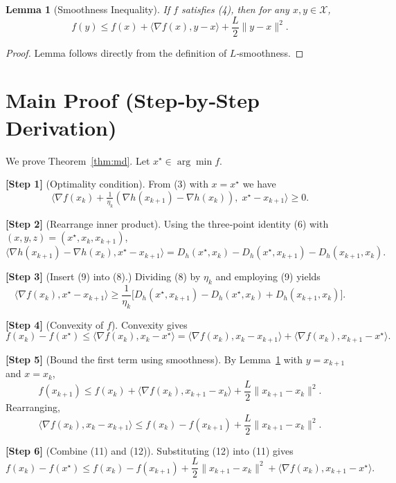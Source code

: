 \documentclass{article}
\newtheorem{lemma}{Lemma}
\begin{document}
\begin{lemma}[Smoothness Inequality]\label{lem:smooth}
If $f$ satisfies (4), then for any $x,y\in\mathcal X$,
\[
f(y)\le f(x)+\langle\nabla f(x),y-x\rangle+\frac{L}{2}\|y-x\|^{2}. \tag{7}
\]
\end{lemma}
\begin{proof}
Lemma follows directly from the definition of $L$‑smoothness. \hfill\qedsymbol
\end{proof}

\section*{Main Proof (Step‑by‑Step Derivation)}
We prove Theorem~\ref{thm:md}. Let $x^{\star}\in\arg\min f$.

\medskip
\noindent\textbf{[Step 1]} (Optimality condition).  
From (3) with $x=x^{\star}$ we have
\[
\big\langle\nabla f(x_{k})+\tfrac{1}{\eta_{k}}(\nabla h(x_{k+1})-\nabla h(x_{k})),
\;x^{\star}-x_{k+1}\big\rangle\ge0.
\tag{8}
\]

\noindent\textbf{[Step 2]} (Rearrange inner product).  
Using the three‑point identity (6) with $(x,y,z)=(x^{\star},x_{k},x_{k+1})$,
\[
\langle\nabla h(x_{k+1})-\nabla h(x_{k}),x^{\star}-x_{k+1}\rangle
= D_{h}(x^{\star},x_{k})-D_{h}(x^{\star},x_{k+1})-D_{h}(x_{k+1},x_{k}). \tag{9}
\]

\noindent\textbf{[Step 3]} (Insert (9) into (8).)  
Dividing (8) by $\eta_{k}$ and employing (9) yields
\[
\langle\nabla f(x_{k}),x^{\star}-x_{k+1}\rangle
\ge\frac{1}{\eta_{k}}\big[D_{h}(x^{\star},x_{k+1})-D_{h}(x^{\star},x_{k})+D_{h}(x_{k+1},x_{k})\big]. \tag{10}
\]

\noindent\textbf{[Step 4]} (Convexity of $f$).  
Convexity gives
\[
f(x_{k})-f(x^{\star})\le\langle\nabla f(x_{k}),x_{k}-x^{\star}\rangle
= \langle\nabla f(x_{k}),x_{k}-x_{k+1}\rangle
   +\langle\nabla f(x_{k}),x_{k+1}-x^{\star}\rangle. \tag{11}
\]

\noindent\textbf{[Step 5]} (Bound the first term using smoothness).  
By Lemma~\ref{lem:smooth} with $y=x_{k+1}$ and $x=x_{k}$,
\[
f(x_{k+1})\le f(x_{k})+\langle\nabla f(x_{k}),x_{k+1}-x_{k}\rangle
            +\frac{L}{2}\|x_{k+1}-x_{k}\|^{2}.
\]
Rearranging,
\[
\langle\nabla f(x_{k}),x_{k}-x_{k+1}\rangle
\le f(x_{k})-f(x_{k+1})+\frac{L}{2}\|x_{k+1}-x_{k}\|^{2}. \tag{12}
\]

\noindent\textbf{[Step 6]} (Combine (11) and (12)).  
Substituting (12) into (11) gives
\[
f(x_{k})-f(x^{\star})
\le f(x_{k})-f(x_{k+1})+\frac{L}{2}\|x_{k+1}-x_{k}\|^{2}
   +\langle\nabla f(x_{k}),x_{k+1}-x^{\star}\rangle. \tag{13}
\]
\end{document}
